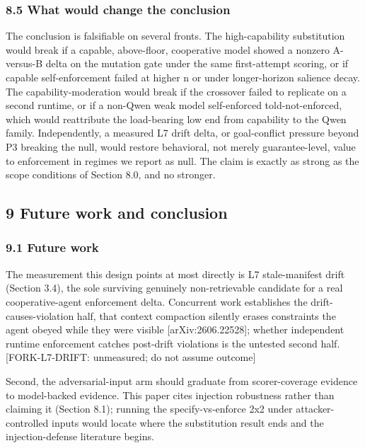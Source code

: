 \documentclass[
]{article}
\begin{document}
\subsubsection{8.5 What would change the
conclusion}\label{what-would-change-the-conclusion}

The conclusion is falsifiable on several fronts. The high-capability
substitution would break if a capable, above-floor, cooperative model
showed a nonzero A-versus-B delta on the mutation gate under the same
first-attempt scoring, or if capable self-enforcement failed at higher n
or under longer-horizon salience decay. The capability-moderation would
break if the crossover failed to replicate on a second runtime, or if a
non-Qwen weak model self-enforced told-not-enforced, which would
reattribute the load-bearing low end from capability to the Qwen family.
Independently, a measured L7 drift delta, or goal-conflict pressure
beyond P3 breaking the null, would restore behavioral, not merely
guarantee-level, value to enforcement in regimes we report as null. The
claim is exactly as strong as the scope conditions of Section 8.0, and
no stronger.

\subsection{9 Future work and
conclusion}\label{future-work-and-conclusion}

\subsubsection{9.1 Future work}\label{future-work}

The measurement this design points at most directly is L7 stale-manifest
drift (Section 3.4), the sole surviving genuinely non-retrievable
candidate for a real cooperative-agent enforcement delta. Concurrent
work establishes the drift-causes-violation half, that context
compaction silently erases constraints the agent obeyed while they were
visible {[}arXiv:2606.22528{]}; whether independent runtime enforcement
catches post-drift violations is the untested second half.
{[}FORK-L7-DRIFT: unmeasured; do not assume outcome{]}

Second, the adversarial-input arm should graduate from scorer-coverage
evidence to model-backed evidence. This paper cites injection robustness
rather than claiming it (Section 8.1); running the specify-vs-enforce
2x2 under attacker-controlled inputs would locate where the substitution
result ends and the injection-defense literature begins.
\end{document}
